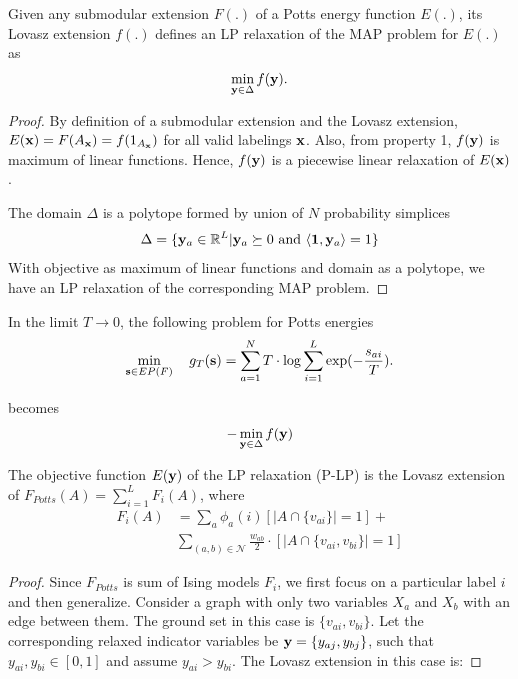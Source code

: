 {\lemma Given any submodular extension $F(.)$ of a Potts energy function $E(.)$, its Lovasz extension $f(.)$ defines an LP relaxation of the MAP problem for $E(.)$ as 
\begin{align}
    \min_{{\bf y} \in \Delta} f({\bf y}).
\end{align}
\begin{proof}
    By definition of a submodular extension and the Lovasz extension, $E({\bf x}) = F(A_{\bf x}) = f(1_{A_{\bf x}})$ for all valid labelings ${\bf x}$. Also, from property 1, $f({\bf y})$ is maximum of linear functions. Hence, $f({\bf y})$ is a piecewise linear relaxation of $E({\bf x})$.

    The domain $\Delta$ is a polytope formed by union of $N$ probability simplices
\begin{equation}
    \Delta = \{{\bf y}_a \in \mathbb{R}^L | {\bf y}_a \succeq 0  \textrm{ and } \langle {\bf 1}, {\bf y}_a \rangle = 1\}
\end{equation}
With objective as maximum of linear functions and domain as a polytope, we have an LP relaxation of the corresponding MAP problem.
\end{proof}

{\proposition In the limit $T \to 0$, the following problem for Potts energies 
\begin{equation}
    \min_{{\bf s} \in EP(F)} \quad g_T ({\bf s}) = \sum_{a = 1}^{N} T \cdot \log \sum_{i = 1}^L \exp(-\frac{s_{ai}}{T}).
\end{equation}

becomes
\begin{align}
    - \min_{{\bf y} \in \Delta} f({\bf y}) 
\end{align}

{\proposition The objective function $E({\bf y})$ of the LP relaxation (P-LP) is the Lovasz extension of $F_{Potts}(A) = \sum_{i = 1}^L F_i(A)$, where
\begin{align}
    F_i(A) &= \sum_a \phi_{a}(i) [|A \cap \{v_{ai}\}| = 1] + \nonumber \\
           &\sum_{(a, b) \in {\mathcal N}} \frac{w_{ab}}{2} \cdot [|A \cap \{v_{ai}, v_{bi}\}| = 1]
\end{align}

\begin{proof}
Since $F_{Potts}$ is sum of Ising models $F_i$, we first focus on a particular label $i$ and then generalize. Consider a graph with only two variables $X_a$ and $X_b$ with an edge between them. The ground set in this case is $\{v_{ai}, v_{bi}\}$. Let the corresponding relaxed indicator variables be ${\bf y} = \{y_{aj}, y_{bj}\}$, such that $y_{ai}, y_{bi} \in [0, 1]$ and assume $y_{ai} > y_{bi}$. The Lovasz extension in this case is:


\end{proof}}}}
